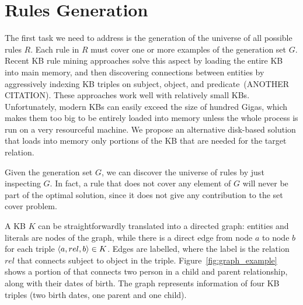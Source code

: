 \section{Rules Generation}
The first task we need to address is the generation of the universe of all possible rules $R$. Each rule in $R$ must cover one or more examples of the generation set $G$.
Recent KB rule mining approaches solve this aspect by loading the entire KB into main memory, and then discovering connections between entities by aggressively indexing KB triples on subject, object, and predicate~\cite{galarraga2015fast}(ANOTHER CITATION). These approaches work well with relatively small KBs. Unfortunately, modern KBs can easily exceed the size of hundred Gigas, which makes them too big to be entirely loaded into memory unless the whole process is run on a very resourceful machine. We propose an alternative disk-based solution that loads into memory only portions of the KB that are needed for the target relation. 

Given the generation set $G$, we can discover the universe of rules by just inspecting $G$. In fact, a rule that does not cover any element of $G$ will never be part of the optimal solution, since it does not give any contribution to the set cover problem.


A KB $K$ can be straightforwardly translated into a directed graph: entities and literals are nodes of the graph, while there is a direct edge from node $a$ to node $b$ for each triple $\langle a,rel,b\rangle \in K$. Edges are labelled, where the label is the relation $rel$ that connects subject to object in the triple. Figure~\ref{fig:graph_example} shows a portion of \dbpedia that connects two person in a child and parent relationship, along with their dates of birth. The graph represents information of four KB triples (two birth dates, one parent and one child).

